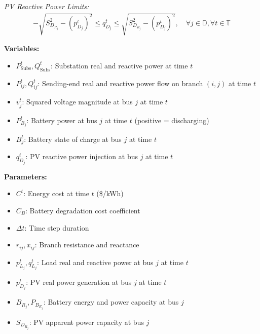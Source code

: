 \textit{PV Reactive Power Limits:}
\begin{align}
    -\sqrt{S_{D_{R_j}}^2 - (p_{D_j}^t)^2} \leq q_{D_j}^t \leq \sqrt{S_{D_{R_j}}^2 - (p_{D_j}^t)^2}, \quad \forall j \in \mathbb{D}, \forall t \in \mathbb{T} \label{eq:pv-reactive-limits-ldf} 
\end{align}

\textbf{Variables:}
\begin{itemize}
    \item $P^t_{\text{Subs}}, Q^t_{\text{Subs}}$: Substation real and reactive power at time $t$
    \item $P_{ij}^t, Q_{ij}^t$: Sending-end real and reactive power flow on branch $(i,j)$ at time $t$
    \item $v_j^t$: Squared voltage magnitude at bus $j$ at time $t$
    \item $P_{B_j}^t$: Battery power at bus $j$ at time $t$ (positive = discharging)
    \item $B_j^t$: Battery state of charge at bus $j$ at time $t$
    \item $q_{D_j}^t$: PV reactive power injection at bus $j$ at time $t$
\end{itemize}

\textbf{Parameters:}
\begin{itemize}
    \item $C^t$: Energy cost at time $t$ (\$/kWh)
    \item $C_B$: Battery degradation cost coefficient
    \item $\Delta t$: Time step duration
    \item $r_{ij}, x_{ij}$: Branch resistance and reactance
    \item $p_{L_j}^t, q_{L_j}^t$: Load real and reactive power at bus $j$ at time $t$
    \item $p_{D_j}^t$: PV real power generation at bus $j$ at time $t$
    \item $B_{R_j}, P_{B_{R_j}}$: Battery energy and power capacity at bus $j$
    \item $S_{D_{R_j}}$: PV apparent power capacity at bus $j$
\end{itemize}